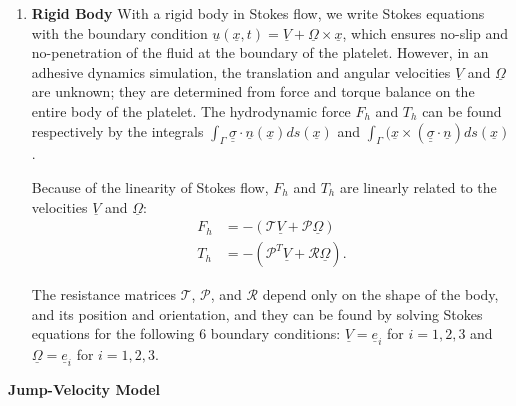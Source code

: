 \documentclass{article}
\begin{document}
\begin{enumerate}
\item \textbf{Rigid Body} With a rigid body in Stokes flow, we write
  Stokes equations with the boundary condition
  $\underline{u}(\underline{x}, t) = \underline{V} +
  \underline{\Omega} \times \underline{x}$, which ensures no-slip and
  no-penetration of the fluid at the boundary of the
  platelet. However, in an adhesive dynamics simulation, the
  translation and angular velocities $\underline{V}$ and
  $\underline{\Omega}$ are unknown; they are determined from force and
  torque balance on the entire body of the platelet. The hydrodynamic
  force $F_h$ and $T_h$ can be found respectively by the integrals
  $\int_\Gamma \underline{\underline{\sigma}} \cdot
  \underline{n}(\underline{x}) ds(\underline{x})$ and $\int_\Gamma
  (\underline{x} \times (\underline{\underline{\sigma}} \cdot
  \underline{n}) ds(\underline{x})$.

  Because of the linearity of Stokes flow, $F_h$ and $T_h$ are
  linearly related to the velocities $\underline{V}$ and
  $\underline{\Omega}$:
  \begin{align*}
    F_h &= -(\mathcal{T} \underline{V} + \mathcal{P}
    \underline{\Omega}) \\
    T_h &= -(\mathcal{P}^T \underline{V} + \mathcal{R}
          \underline{\Omega}).
  \end{align*}

  The resistance matrices $\mathcal{T}$, $\mathcal{P}$, and
  $\mathcal{R}$ depend only on the shape of the body, and its position
  and orientation, and they can be found by solving Stokes equations
  for the following 6 boundary conditions: $\underline{V} =
  \underline{e}_i$ for $i = 1, 2, 3$ and $\underline{\Omega} =
  \underline{e}_i$ for $i = 1, 2, 3$.
\end{enumerate}

\large{\textbf{Jump-Velocity Model}}
\end{document}

